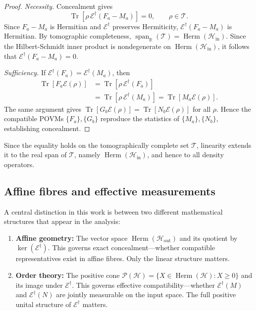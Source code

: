 \documentclass[
aps,pra,twocolumn,10pt,
superscriptaddress,longbibliography,floatfix
]{revtex4-2}
\DeclareMathOperator{\Tr}{Tr}
\DeclareMathOperator{\Herm}{Herm}
\begin{document}
\begin{proof}
\emph{Necessity.} Concealment gives
\begin{equation}
\Tr[\rho\,\mathcal E^\dagger(F_a-M_a)]=0,
\qquad \rho\in\mathcal T.
\end{equation}
Since $F_a-M_a$ is Hermitian and $\mathcal{E}^\dagger$ preserves Hermiticity, $\mathcal{E}^\dagger(F_a-M_a)$ is Hermitian. By tomographic completeness, $\operatorname{span}_{\mathbb{R}}(\mathcal{T}) = \Herm(\mathcal{H}_{\mathrm{in}})$. Since the Hilbert-Schmidt inner product is nondegenerate on $\Herm(\mathcal{H}_{\mathrm{in}})$, it follows that $\mathcal{E}^\dagger(F_a-M_a) = 0$.

\emph{Sufficiency.} If $\mathcal{E}^\dagger(F_a) = \mathcal{E}^\dagger(M_a)$, then
\begin{align*}
\Tr[F_a\mathcal E(\rho)]
&=\Tr[\rho\,\mathcal E^\dagger(F_a)]\\
&=\Tr[\rho\,\mathcal E^\dagger(M_a)]
=\Tr[M_a\mathcal E(\rho)].
\end{align*}
The same argument gives $\Tr[G_b\mathcal{E}(\rho)] = \Tr[N_b\mathcal{E}(\rho)]$ for all $\rho$. Hence the compatible POVMs $\{F_a\},\{G_b\}$ reproduce the statistics of $\{M_a\},\{N_b\}$, establishing concealment.
\end{proof}

Since the equality holds on the tomographically complete set $\mathcal T$, linearity extends it to the real span of $\mathcal T$, namely $\Herm(\mathcal H_{\mathrm{in}})$, and hence to all density operators.

\subsection{Affine fibres and effective measurements}

A central distinction in this work is between two different mathematical structures that appear in the analysis:

\begin{enumerate}
\item \textbf{Affine geometry:} The vector space $\Herm(\mathcal H_{\mathrm{out}})$ and its quotient by $\ker(\mathcal E^\dagger)$. This governs exact concealment---whether compatible representatives exist in affine fibres. Only the linear structure matters.

\item \textbf{Order theory:} The positive cone $\mathcal P(\mathcal H) = \{X \in \Herm(\mathcal H) : X \ge 0\}$ and its image under $\mathcal E^\dagger$. This governs effective compatibility---whether $\mathcal E^\dagger(M)$ and $\mathcal E^\dagger(N)$ are jointly measurable on the input space. The full positive unital structure of $\mathcal E^\dagger$ matters.
\end{enumerate}
\end{document}
